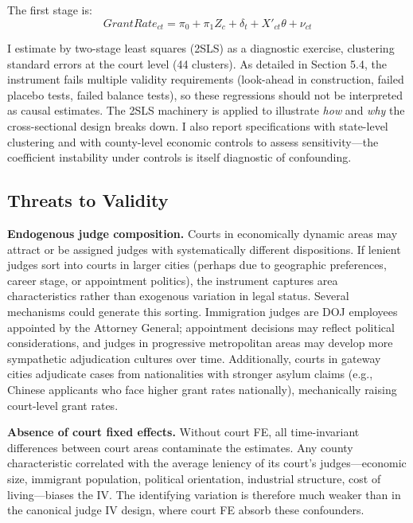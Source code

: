 \documentclass[12pt]{article}
\begin{document}
The first stage is:
\begin{equation}
GrantRate_{ct} = \pi_0 + \pi_1 Z_{c} + \delta_t + X'_{ct}\theta + \nu_{ct}
\label{eq:firststage}
\end{equation}

I estimate by two-stage least squares (2SLS) as a diagnostic exercise, clustering standard errors at the court level (44 clusters). As detailed in Section 5.4, the instrument fails multiple validity requirements (look-ahead in construction, failed placebo tests, failed balance tests), so these regressions should not be interpreted as causal estimates. The 2SLS machinery is applied to illustrate \textit{how} and \textit{why} the cross-sectional design breaks down. I also report specifications with state-level clustering and with county-level economic controls to assess sensitivity---the coefficient instability under controls is itself diagnostic of confounding.

\subsection{Threats to Validity}

\textbf{Endogenous judge composition.} Courts in economically dynamic areas may attract or be assigned judges with systematically different dispositions. If lenient judges sort into courts in larger cities (perhaps due to geographic preferences, career stage, or appointment politics), the instrument captures area characteristics rather than exogenous variation in legal status. Several mechanisms could generate this sorting. Immigration judges are DOJ employees appointed by the Attorney General; appointment decisions may reflect political considerations, and judges in progressive metropolitan areas may develop more sympathetic adjudication cultures over time. Additionally, courts in gateway cities adjudicate cases from nationalities with stronger asylum claims (e.g., Chinese applicants who face higher grant rates nationally), mechanically raising court-level grant rates.

\textbf{Absence of court fixed effects.} Without court FE, all time-invariant differences between court areas contaminate the estimates. Any county characteristic correlated with the average leniency of its court's judges---economic size, immigrant population, political orientation, industrial structure, cost of living---biases the IV. The identifying variation is therefore much weaker than in the canonical judge IV design, where court FE absorb these confounders.
\end{document}
